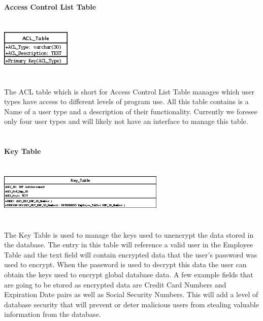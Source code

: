 \documentclass{report}
\begin{document}
	{\bf Access Control List Table}\\
	\\
	\\
	\includegraphics{Tables/ACL.png}\\
	\\
	\\
	The ACL table which is short for Access Control List Table manages which user types have access
	to different levels of program use. All this table contains is a Name of a user type and a description
	of their functionality. Currently we foresee only four user types and will likely not have an
	interface to manage this table.\\
	\\
	\\
	{\bf Key Table}\\
	\\
	\\
	\includegraphics{Tables/KeyTable.png}\\
	\\
	\\
	The Key Table is used to manage the keys used to unencrypt the data stored in the database. The
	entry in this table will reference a valid user in the Employee Table and the text field will
	contain encrypted data that the user's password was used to encrypt. When the password is used
	to decrypt this data the user can obtain the keys used to encrypt global database data. A few
	example fields that are going to be stored as encrypted data are Credit Card Numbers and Expiration
	Date pairs as well as Social Security Numbers. This will add a level of database security that
	will prevent or deter malicious users from stealing valuable information from the database.\\
	\\

	\newpage
\end{document}
